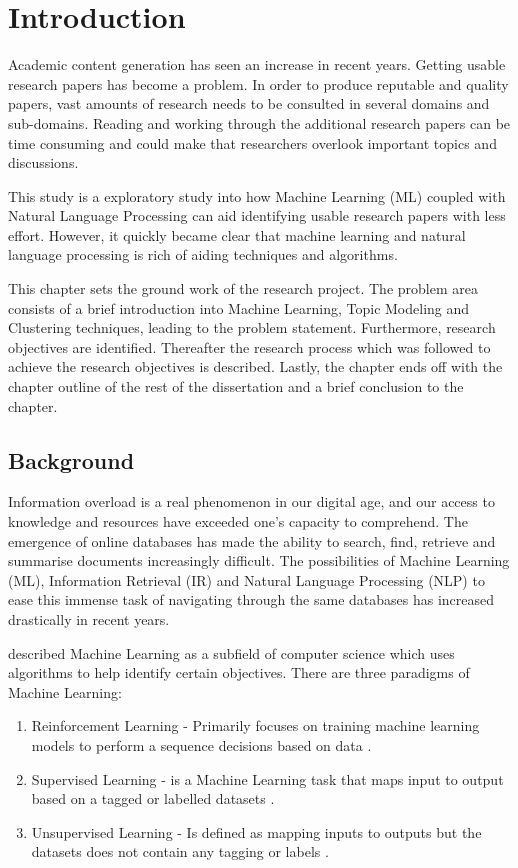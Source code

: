 \chapter{Introduction}
\label{chap: Chapter 1}
Academic content generation has seen an increase in recent years. Getting usable research papers has become a problem. In order to produce reputable and quality papers, vast amounts of research needs to be consulted in several domains and sub-domains. Reading and working through the additional research papers can be time consuming and could make that researchers overlook important topics and discussions.

This study is a exploratory study into how Machine Learning (ML) coupled with Natural Language Processing can aid identifying usable research papers with less effort. However, it quickly became clear that machine learning and natural language processing is rich of aiding techniques and algorithms. 

This chapter sets the ground work of the research project. The problem area consists of a brief introduction into Machine Learning, Topic Modeling and Clustering techniques, leading to the problem statement. Furthermore, research objectives are identified. Thereafter the research process which was followed to achieve the research objectives is described. Lastly, the chapter ends off with the chapter outline of the rest of the dissertation and a brief conclusion to the chapter.

\section{Background}
Information overload is a real phenomenon in our digital age, and our access to knowledge and resources have exceeded one’s capacity to comprehend. The emergence of online databases has made the ability to search, find, retrieve and summarise documents increasingly difficult. The possibilities of Machine Learning (ML), Information Retrieval (IR) and Natural Language Processing (NLP) to ease this immense task of navigating through the same databases has increased drastically in recent years. 

 described Machine Learning as a subfield of computer science which uses algorithms to help identify certain objectives. There are three paradigms of Machine Learning:
\begin{enumerate}
    \item Reinforcement Learning - Primarily focuses on training machine learning models to perform a sequence decisions based on data \cite{DBLP:journals/corr/abs-1806-08894}.
    \item Supervised Learning - is a Machine Learning task that maps input to output based on a tagged or labelled datasets \cite{singh2019natural}.
    \item Unsupervised Learning - Is defined as mapping inputs to outputs but the datasets does not contain any tagging or labels \cite{hastie2009unsupervised}.
\end{enumerate}

